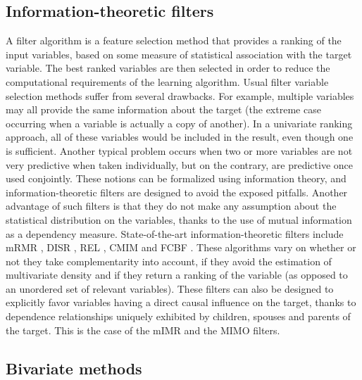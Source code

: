\subsection{Information-theoretic filters}

A filter algorithm is a feature selection method that provides a ranking of the
input variables, based on some measure of statistical association with the
target variable. The best ranked variables are then selected in order to reduce
the computational requirements of the learning algorithm. Usual filter variable
selection methods suffer from several drawbacks. For example, multiple variables
may all provide the same information about the target (the extreme case
occurring when a variable is actually a copy of another). In a univariate
ranking approach, all of these variables would be included in the result, even
though one is sufficient. Another typical problem occurs when two or more
variables are not very predictive when taken individually, but on the contrary,
are predictive once used conjointly. These notions can be formalized using
information theory, and information-theoretic filters are designed to avoid the
exposed pitfalls. Another advantage of such filters is that they do not make any
assumption about the statistical distribution on the variables, thanks to the
use of mutual information as a dependency measure. State-of-the-art
information-theoretic filters include mRMR \parencite{peng2005feature}, DISR
\parencite{meyer2008information}, REL \parencite{bell2000formalism}, CMIM
\parencite{fleuret2004fast} and FCBF \parencite{yu2004efficient}. These
algorithms vary on whether or not they take complementarity into account, if
they avoid the estimation of multivariate density and if they return a ranking
of the variable (as opposed to an unordered set of relevant variables). These
filters can also be designed to explicitly favor variables having a direct
causal influence on the target, thanks to dependence relationships uniquely
exhibited by children, spouses and parents of the target. This is the case of
the mIMR \parencite{bontempi2010causal} and the MIMO
\parencite{bontempi2011multiple} filters.

\subsection{Bivariate methods}

